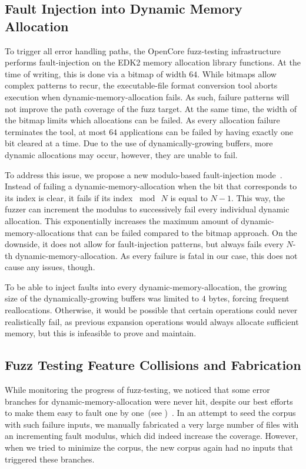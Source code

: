 \subsection{Fault Injection into Dynamic Memory Allocation}

To trigger all error handling paths, the OpenCore \gls{fuzz-testing} infrastructure performs \gls{fault-injection} on the \gls{EDK2} memory allocation library functions. At the time of writing, this is done via a  bitmap of width $64$. While bitmaps allow complex patterns to recur, the \gls{executable-file} format conversion tool aborts execution when \gls{dynamic-memory-allocation} fails. As such, failure patterns will not improve the path coverage of the fuzz target. At the same time, the width of the bitmap limits which allocations can be failed. As every allocation failure terminates the tool, at most $64$ applications can be failed by having exactly one bit cleared at a time. Due to the use of dynamically-growing buffers, more dynamic allocations may occur, however, they are unable to fail.

To address this issue, we propose a new modulo-based \gls{fault-injection} mode~\cite{thesis-git}. Instead of failing a \gls{dynamic-memory-allocation} when the bit that corresponds to its index is clear, it fails if its index $\bmod~N$ is equal to $N - 1$. This way, the fuzzer can increment the modulus to successively fail every individual dynamic allocation. This exponentially increases the maximum amount of \glspl{dynamic-memory-allocation} that can be failed compared to the bitmap approach. On the downside, it does not allow for \gls{fault-injection} patterns, but always fails every $N$-th \gls{dynamic-memory-allocation}. As every failure is fatal in our case, this does not cause any issues, though.

To be able to inject faults into every \gls{dynamic-memory-allocation}, the growing size of the dynamically-growing buffers was limited to $4$ \glspl{byte}, forcing frequent reallocations. Otherwise, it would be possible that certain operations could never realistically fail, as previous expansion operations would always allocate sufficient memory, but this is infeasible to prove and maintain.

\subsection{Fuzz Testing Feature Collisions and Fabrication}

While monitoring the progress of \gls{fuzz-testing}, we noticed that some error branches for \gls{dynamic-memory-allocation} were never hit, despite our best efforts to make them easy to fault one by one~(see )~\cite{thesis-git}. In an attempt to seed the corpus with such failure inputs, we manually fabricated a very large number of files with an incrementing fault modulus, which did indeed increase the coverage. However, when we tried to minimize the corpus, the new corpus again had no inputs that triggered these branches.

